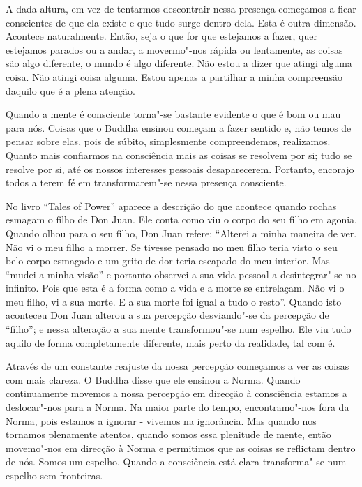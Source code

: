 A dada altura, em vez de tentarmos descontrair nessa presença começamos
a ficar conscientes de que ela existe e que tudo surge dentro dela. Esta
é outra dimensão. Acontece naturalmente. Então, seja o que for que
estejamos a fazer, quer estejamos parados ou a andar, a movermo"-nos
rápida ou lentamente, as coisas são algo diferente, o mundo é algo
diferente. Não estou a dizer que atingi alguma coisa. Não atingi coisa
alguma. Estou apenas a partilhar a minha compreensão daquilo que é a
plena atenção.

Quando a mente é consciente torna"-se bastante evidente o que é bom ou
mau para nós. Coisas que o Buddha ensinou começam a fazer sentido e, não
temos de pensar sobre elas, pois de súbito, simplesmente compreendemos,
realizamos. Quanto mais confiarmos na consciência mais as coisas se
resolvem por si; tudo se resolve por si, até os nossos interesses
pessoais desaparecerem. Portanto, encorajo todos a terem fé em
transformarem"-se nessa presença consciente.

No livro ``Tales of Power'' aparece a descrição do que acontece quando
rochas esmagam o filho de Don Juan. Ele conta como viu o corpo do seu
filho em agonia. Quando olhou para o seu filho, Don Juan refere:
``Alterei a minha maneira de ver. Não vi o meu filho a morrer. Se
tivesse pensado no meu filho teria visto o seu belo corpo esmagado e um
grito de dor teria escapado do meu interior. Mas ``mudei a minha visão''
e portanto observei a sua vida pessoal a desintegrar"-se no infinito.
Pois que esta é a forma como a vida e a morte se entrelaçam. Não vi o
meu filho, vi a sua morte. E a sua morte foi igual a tudo o resto''.
Quando isto aconteceu Don Juan alterou a sua percepção desviando"-se da
percepção de ``filho''; e nessa alteração a sua mente transformou"-se num
espelho. Ele viu tudo aquilo de forma completamente diferente, mais
perto da realidade, tal com é.

Através de um constante reajuste da nossa percepção começamos a ver as
coisas com mais clareza. O Buddha disse que ele ensinou a Norma. Quando
continuamente movemos a nossa percepção em direcção à consciência
estamos a deslocar"-nos para a Norma. Na maior parte do tempo,
encontramo"-nos fora da Norma, pois estamos a ignorar - vivemos na
ignorância. Mas quando nos tornamos plenamente atentos, quando somos
essa plenitude de mente, então movemo"-nos em direcção à Norma e
permitimos que as coisas se reflictam dentro de nós. Somos um espelho.
Quando a consciência está clara transforma"-se num espelho sem
fronteiras.

